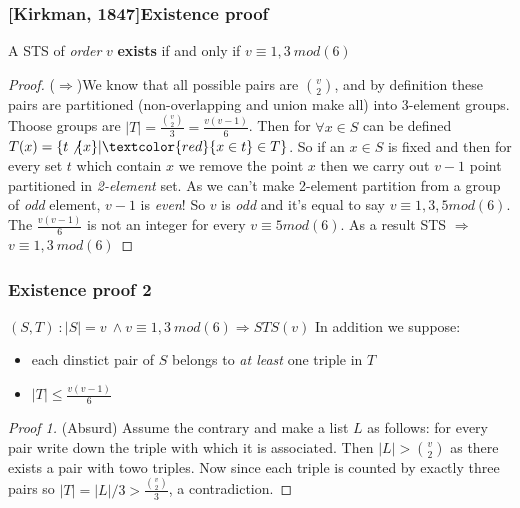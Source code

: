 \begin{frame}
	\frametitle{[Kirkman, 1847]Existence proof}
	\begin{theorem}
		A STS of \textit{order} $v$ \textbf{exists} if and only if $v\equiv 1,3\ mod(6)$  
	\end{theorem}
	\begin{proof}
		($\Rightarrow$)We know that all possible pairs are $\binom{v}{2}$, and by definition these pairs are partitioned (non-overlapping and union make all) into 3-element groups. Thoose groups are $|T|=\frac{\binom{v}{2}}{3}=\frac{v(v-1)}{6}$. Then for $\forall x \in S$ can be defined $T(x) = \{ t\not\{x\} | \textcolor{red}{x \in t} \in T \}$. So if an $x \in S$ is fixed and then for every set $t$ which contain $x$ we remove the point $x$ then we carry out $v-1$ point partitioned in \textit{2-element} set. As we can't make 2-element partition from a group of \textit{odd} element, $v-1$ is \textit{even}! So $v$ is \textit{odd} and it's equal to say $v \equiv 1,3,5 mod(6)$. The $\frac{v(v-1)}{6}$ is not an integer for every $v \equiv 5 mod(6)$. As a result STS $\Rightarrow$ $v\equiv 1,3\ mod(6)$
	\end{proof}
\end{frame}

\begin{frame}
\frametitle{Existence proof 2}
\begin{block}{$(S,T)\ : |S|=v\ \wedge v\equiv 1,3\ mod(6) \Rightarrow STS(v)$}
	In addition we suppose:
	\begin{itemize}
		\item each dinstict pair of $S$ belongs to \textit{at least} one triple in $T$
		\item $|T| \le \frac{v(v-1)}{6}$
	\end{itemize}
\end{block}
\begin{proof}[Proof 1]
	(Absurd) Assume the contrary and make a list $L$ as follows: for every pair write down the triple with which it is associated. Then $|L|> \binom{v}{2}$ as there exists a pair with towo triples. Now since each triple is counted by exactly three pairs so $|T| =|L|/3 > \frac{\binom{v}{2}}{3}$, a contradiction.
\end{proof}


\end{frame}

